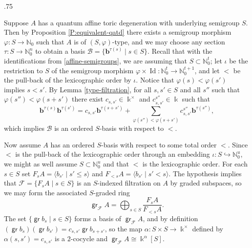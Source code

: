 \documentclass[11pt,fleqn]{article}
\makeatletter
\renewenvironment{proof}[1][\textit{Proof}]{\par
  \pushQED{\qed}%
  \normalfont \topsep.75\paraskip\relax
  \trivlist
  \item[\hskip\labelsep
        \itshape
    #1\@addpunct{.}]\ignorespaces
}{%
  \popQED\endtrivlist\@endpefalse
}
\newcommand\NN{\mathbb N}
\renewcommand\to{\longrightarrow}
\renewcommand\phi{\varphi}
\newcommand\F{\mathcal F}
\renewcommand\b{\mathbf b}
\renewcommand\k{\Bbbk}
\DeclareMathOperator\gr{\mathsf{gr}}
\DeclareMathOperator\Id{Id}
\makeatother
\begin{document}
\begin{proof}
Suppose $A$ has a quantum affine toric degeneration with underlying semigroup $S$. Then 
by Proposition \ref{P:equivalent-qatd} there exists a semigroup morphism $\phi:S\to 
\NN_0$ such that $A$ is of $(S, \phi)$-type, and we may choose any section $\tau: S \to 
\NN_0^n$ to obtain a basis $\mathcal B = \{\b^{\tau(s)} \mid s \in S\}$. Recall that with
the identifications from \ref{affine-semigroups}, we are assuming that $S \subset 
\NN_0^t$; let $\iota$ be the restriction to $S$ of the semigroup morphism $\phi \times 
\Id: \NN_0^t \to \NN_0^{t+1}$, and let $<$ be the pull-back of the lexicographic order 
by $\iota$. Notice that $\phi(s) < \phi(s')$ implies $s<s'$. By Lemma 
\ref{type-filtration}, for all $s,s' \in S$ and all $s''$ such that $\phi(s'') < 
\phi(s+s')$ there exist $c_{s,s'} \in \k^\times$ and $c_{s,s'}^{s''} \in \k$ such that
\[
  \b^{\tau(s)}\b^{\tau(s')} 
    = c_{s,s'}\b^{\tau(s+s')} 
      + \sum_{\phi(s'') < \phi(s+s')} c_{s,s'}^{s''} \b^{\tau(s'')},
\]
which implies $\mathcal B$ is an ordered $S$-basis with respect to $<$.

Now assume $A$ has an ordered $S$-basis with respect to some total order $<$. Since $<$
is the pull-back of the lexicographic order through an embedding $\iota: S 
\hookrightarrow \NN_0^u$, we might as well assume $S \subset \NN_0^u$ and that $<$ is 
the lexicographic order. For each $s \in S$ set $F_sA = \langle b_{s'} \mid s' \leq s 
\rangle$ and $F_{<s}A = \langle b_{s'} \mid s' < s \rangle$. The hypothesis implies that
$\mathcal F = \{F_sA \mid s \in S\}$ is an $S$-indexed filtration on $A$ by graded 
subspaces, so we may form the associated $S$-graded ring
\[
  \gr_\F A = \bigoplus_{s \in S} \frac{F_sA}{F_{<s}A}.
\]
The set $\{\gr b_s \mid s \in S\}$ forms a basis of $\gr_\F A$, and by definition
$(\gr b_s) (\gr b_{s'}) = c_{s,s'} \gr b_{s+s'}$, so the map $\alpha: S \times S \to 
\k^\times$ defined by $\alpha(s,s') = c_{s,s'}$ is a $2$-cocycle and $\gr_\F A \cong 
\k^\alpha[S]$.


\end{proof}
\end{document}
